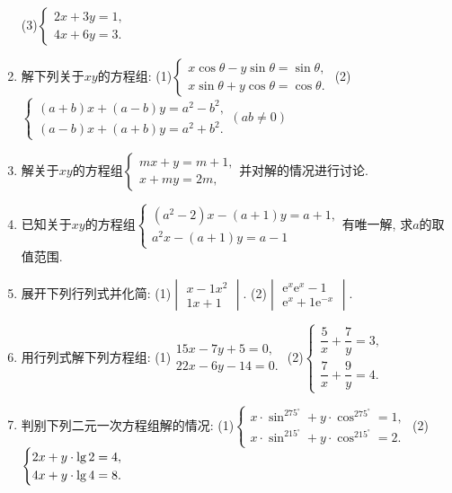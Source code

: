 \documentclass[10pt,a4paper]{article}
\begin{document}
\begin{enumerate}[1.]
(3)$\begin{cases}
    2x+3y=1,  \\4x+6y=3.  \end{cases}$
\item 解下列关于$xy$的方程组:
(1)$\begin{cases}
    x\cos \theta -y\sin \theta =\sin \theta ,  \\x\sin \theta +y\cos \theta =\cos \theta .  \end{cases}$
(2)$\begin{cases}
 (a+b)x+(a-b)y=a^2-b^2,  \\(a-b)x+(a+b)y=a^2+b^2.  \end{cases} (ab\ne 0)$
\item 解关于$xy$的方程组$\begin{cases}
    mx+y=m+1,  \\x+my=2m,  \end{cases}$并对解的情况进行讨论.
\item 已知关于$xy$的方程组$\begin{cases}
 (a^2-2)x-(a+1)y=a+1,  \\a^2x-(a+1)y=a-1  \end{cases}$有唯一解, 求$a$的取值范围.
\item 展开下列行列式并化简:
(1)$\begin{vmatrix}
    x-1  x^2  \\1  x+1  \end{vmatrix}$. (2)$\begin{vmatrix}
    \mathrm{e}^x  \mathrm{e}^x-1  \\\mathrm{e}^x+1  \mathrm{e}^{-x}  \end{vmatrix}$.
\item 用行列式解下列方程组:
(1)$\begin{matrix}
    15x-7y+5=0,  \\22x-6y-14=0.  \end{matrix}$ (2)$\begin{cases}
    \dfrac 5x+\dfrac 7y=3,  \\\dfrac 7x+\dfrac 9y=4.  \end{cases}$
\item 判别下列二元一次方程组解的情况:
(1)$\begin{cases}
    x\cdot \sin ^275^{\circ }+y\cdot \cos ^275^{\circ }=1,  \\x\cdot \sin ^215^{\circ }+y\cdot \cos ^215^{\circ }=2.  \end{cases}$ (2)$\begin{cases}
    \text2x+y\cdot \lg 2=4,  \\4x+y\cdot \lg 4=8.  \end{cases}$

\end{enumerate}
\end{document}

